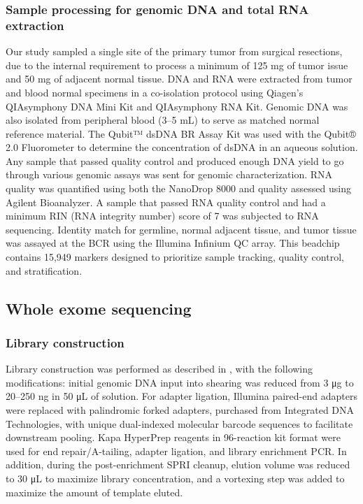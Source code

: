 \subsubsection{Sample processing for genomic DNA and total RNA extraction}
Our study sampled a single site of the primary tumor from surgical resections, due to the internal requirement to process a minimum of 125 mg of tumor issue and 50 mg of adjacent normal tissue. DNA and RNA were extracted from tumor and blood normal specimens in a co-isolation protocol using Qiagen’s QIAsymphony DNA Mini Kit and QIAsymphony RNA Kit. Genomic DNA was also isolated from peripheral blood (3--5 mL) to serve as matched normal reference material. The Qubit™ dsDNA BR Assay Kit was used with the Qubit® 2.0 Fluorometer to determine the concentration of dsDNA in an aqueous solution. Any sample that passed quality control and produced enough DNA yield to go through various genomic assays was sent for genomic characterization. RNA quality was quantified using both the NanoDrop 8000 and quality assessed using Agilent Bioanalyzer. A sample that passed RNA quality control and had a minimum RIN (RNA integrity number) score of 7 was subjected to RNA sequencing. Identity match for germline, normal adjacent tissue, and tumor tissue was assayed at the BCR using the Illumina Infinium QC array. This beadchip contains 15,949 markers designed to prioritize sample tracking, quality control, and stratification.


\subsection{Whole exome sequencing}

\subsubsection{Library construction}
Library construction was performed as described in \cite{fishers_nusbaumc:ScalableFully2011}, with the following modifications: initial genomic DNA input into shearing was reduced from 3 μg to 20--250 ng in 50 μL of solution. For adapter ligation, Illumina paired-end adapters were replaced with palindromic forked adapters, purchased from Integrated DNA Technologies, with unique dual-indexed molecular barcode sequences to facilitate downstream pooling. Kapa HyperPrep reagents in 96-reaction kit format were used for end repair/A-tailing, adapter ligation, and library enrichment PCR. In addition, during the post-enrichment SPRI cleanup, elution volume was reduced to 30 μL to maximize library concentration, and a vortexing step was added to maximize the amount of template eluted.

